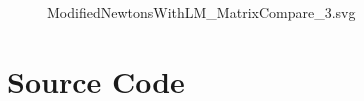\documentclass{article}
\begin{document}
    \begin{figure}[H]
        \centering
        
        \caption{ModifiedNewtonsWithLM_MatrixCompare_3.svg}
        \label{fig:ModifiedNewtonsWithLM_MatrixCompare_3.svg}
    \end{figure}
    

    \section{Source Code}

\end{document}
